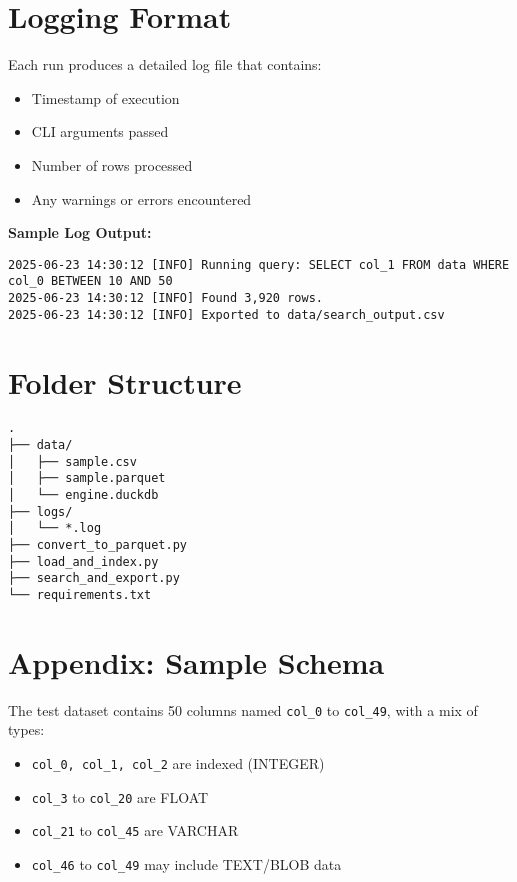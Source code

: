 \documentclass[a4paper,11pt]{article}
\begin{document}
\section{Logging Format}

\begin{tcolorbox}[colback=blue!5, colframe=blue!40!black, title=Log Structure]
Each run produces a detailed log file that contains:
\begin{itemize}[leftmargin=1em]
  \item Timestamp of execution
  \item CLI arguments passed
  \item Number of rows processed
  \item Any warnings or errors encountered
\end{itemize}
\end{tcolorbox}

\textbf{Sample Log Output:}
\begin{lstlisting}[caption=Example Log Output]
2025-06-23 14:30:12 [INFO] Running query: SELECT col_1 FROM data WHERE col_0 BETWEEN 10 AND 50
2025-06-23 14:30:12 [INFO] Found 3,920 rows.
2025-06-23 14:30:12 [INFO] Exported to data/search_output.csv
\end{lstlisting}

\section{Folder Structure}

\begin{lstlisting}[caption=Project Directory Structure]
.
├── data/
│   ├── sample.csv
│   ├── sample.parquet
│   └── engine.duckdb
├── logs/
│   └── *.log
├── convert_to_parquet.py
├── load_and_index.py
├── search_and_export.py
└── requirements.txt
\end{lstlisting}

\section{Appendix: Sample Schema}

\begin{tcolorbox}[colback=yellow!10, colframe=yellow!50!black, title=Dataset Schema]
The test dataset contains 50 columns named \texttt{col\_0} to \texttt{col\_49}, with a mix of types:

\begin{itemize}[leftmargin=1em]
  \item \texttt{col\_0, col\_1, col\_2} are indexed (INTEGER)
  \item \texttt{col\_3} to \texttt{col\_20} are FLOAT
  \item \texttt{col\_21} to \texttt{col\_45} are VARCHAR
  \item \texttt{col\_46} to \texttt{col\_49} may include TEXT/BLOB data
\end{itemize}
\end{tcolorbox}
\end{document}
